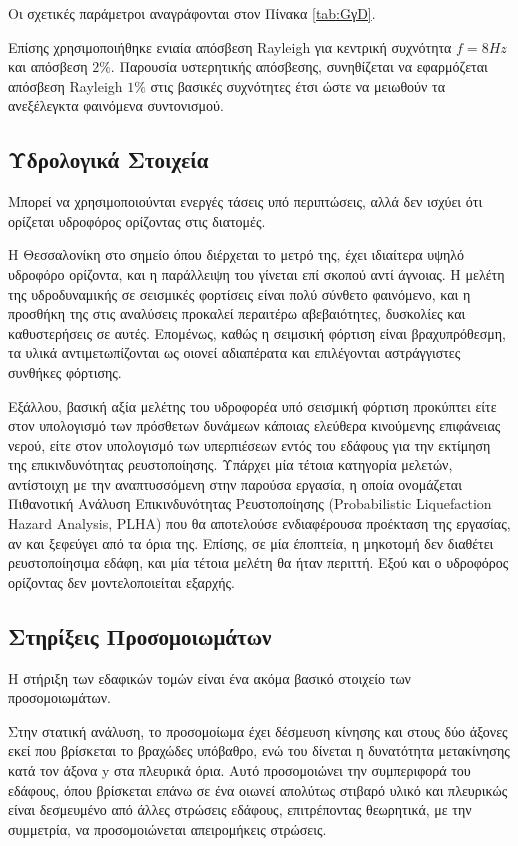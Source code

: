 Οι σχετικές παράμετροι αναγράφονται στον Πίνακα \ref{tab:GγD}.

Επίσης χρησιμοποιήθηκε ενιαία απόσβεση Rayleigh για κεντρική συχνότητα $f = 8Hz$ και απόσβεση $2\%$. Παρουσία υστερητικής απόσβεσης, συνηθίζεται να εφαρμόζεται απόσβεση Rayleigh $1\%$ στις βασικές συχνότητες έτσι ώστε να μειωθούν τα ανεξέλεγκτα φαινόμενα συντονισμού.

\subsection{Υδρολογικά Στοιχεία}
Μπορεί να χρησιμοποιούνται ενεργές τάσεις υπό περιπτώσεις, αλλά δεν ισχύει ότι ορίζεται υδροφόρος ορίζοντας στις διατομές.

Η Θεσσαλονίκη στο σημείο όπου διέρχεται το μετρό της, έχει ιδιαίτερα υψηλό υδροφόρο ορίζοντα, και η παράλλειψη του γίνεται επί σκοπού αντί άγνοιας. Η μελέτη της υδροδυναμικής σε σεισμικές φορτίσεις είναι πολύ σύνθετο φαινόμενο, και η προσθήκη της στις αναλύσεις προκαλεί περαιτέρω αβεβαιότητες, δυσκολίες και καθυστερήσεις σε αυτές. Επομένως, καθώς η σειμσική φόρτιση είναι βραχυπρόθεσμη, τα υλικά αντιμετωπίζονται ως οιονεί αδιαπέρατα και επιλέγονται αστράγγιστες συνθήκες φόρτισης.

Εξάλλου, βασική αξία μελέτης του υδροφορέα υπό σεισμική φόρτιση προκύπτει είτε στον υπολογισμό των πρόσθετων δυνάμεων κάποιας ελεύθερα κινούμενης επιφάνειας νερού, είτε στον υπολογισμό των υπερπιέσεων εντός του εδάφους για την εκτίμηση της επικινδυνότητας ρευστοποίησης. Υπάρχει μία τέτοια κατηγορία μελετών, αντίστοιχη με την αναπτυσσόμενη στην παρούσα εργασία, η οποία ονομάζεται Πιθανοτική Ανάλυση Επικινδυνότητας Ρευστοποίησης (Probabilistic Liquefaction Hazard Analysis, PLHA) που θα αποτελούσε ενδιαφέρουσα προέκταση της εργασίας, αν και ξεφεύγει από τα όρια της. Επίσης, σε μία έποπτεία, η μηκοτομή δεν διαθέτει ρευστοποίησιμα εδάφη, και μία τέτοια μελέτη θα ήταν περιττή. Εξού και ο υδροφόρος ορίζοντας δεν μοντελοποιείται εξαρχής.

\subsection{Στηρίξεις Προσομοιωμάτων}
Η στήριξη των εδαφικών τομών είναι ένα ακόμα βασικό στοιχείο των προσομοιωμάτων.

Στην στατική ανάλυση, το προσομοίωμα έχει δέσμευση κίνησης και στους δύο άξονες εκεί που βρίσκεται το βραχώδες υπόβαθρο, ενώ του δίνεται η δυνατότητα μετακίνησης κατά τον άξονα y στα πλευρικά όρια. Αυτό προσομοιώνει την συμπεριφορά του εδάφους, όπου βρίσκεται επάνω σε ένα οιωνεί απολύτως στιβαρό υλικό και πλευρικώς είναι δεσμευμένο από άλλες στρώσεις εδάφους, επιτρέποντας θεωρητικά, με την συμμετρία, να προσομοιώνεται απειρομήκεις στρώσεις.

